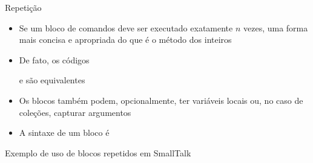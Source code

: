 \begin{frame}[fragile]{Repetição}

    \begin{itemize}
        \item Se um bloco de comandos deve ser executado exatamente $n$ vezes, uma forma mais
            concisa e apropriada do que   é o método 
             dos inteiros


        \item De fato, os códigos


        e
        são equivalentes

        \item Os blocos também podem, opcionalmente, ter variáveis locais ou, no caso de
            coleções, capturar argumentos 

        \item A sintaxe de um bloco é

    \end{itemize}

\end{frame}

\begin{frame}[fragile]{Exemplo de uso de blocos repetidos em SmallTalk}
\end{frame}

